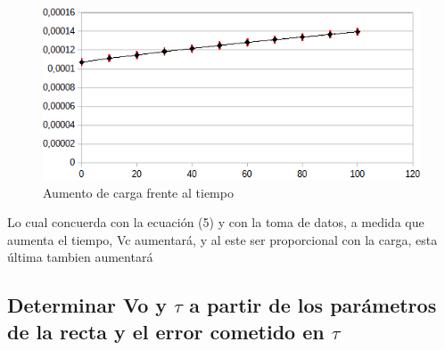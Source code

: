 \documentclass{article}
\begin{document}
\begin{figure}[H]
    \centering
    \includegraphics[width=1\linewidth]{image2.png}
    \caption{Aumento de carga frente al tiempo}
    \label{fig:enter-label}
\end{figure}
Lo cual concuerda con la ecuación (5) y con la toma de datos, a medida que aumenta el tiempo, Vc aumentará, y al este ser proporcional con la carga, esta última tambien aumentará

\newpage
\subsection{Determinar Vo y $\tau$ a partir de los parámetros de la recta y el error cometido en $\tau$}
\end{document}
